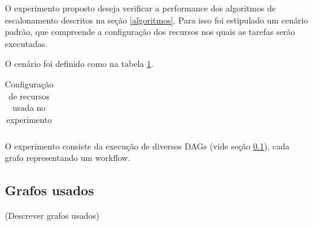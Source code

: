 \documentclass[a4paper,10pt]{article}
\begin{document}
O experimento proposto deseja verificar a performance dos algoritmos de escalonamento
descritos na seção \ref{algoritmos}. Para isso foi estipulado um cenário padrão, que
compreende a configuração dos recursos nos quais as tarefas serão executadas.

O cenário foi definido como na tabela \ref{tab:datacenter}.

\begin{table}
\centering

  \begin{tabular}{|l|l|}  


  \end{tabular}
  \caption{Configuração de recursos usada no experimento}
  \label{tab:datacenter}
\end{table}

O experimento consiste da execução de diversos DAGs (vide seção \ref{grafosusados}),
cada grafo representando um workflow.


\subsection{Grafos usados}
\label{grafosusados}

(Descrever grafos usados)
\end{document}

